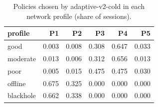 \begin{table}[htbp]
\centering
\small
\caption{Policies chosen by adaptive-v2-cold in each network profile (share of sessions).}
\label{tab:policy_share_adaptive_v2_cold}
\begin{tabular}{l r r r r r}
\toprule
profile & P1 & P2 & P3 & P4 & P5 \\
\midrule
good & 0.003 & 0.008 & 0.308 & 0.647 & 0.033 \\
moderate & 0.013 & 0.006 & 0.312 & 0.656 & 0.013 \\
poor & 0.005 & 0.015 & 0.475 & 0.475 & 0.030 \\
offline & 0.675 & 0.325 & 0.000 & 0.000 & 0.000 \\
blackhole & 0.662 & 0.338 & 0.000 & 0.000 & 0.000 \\
\bottomrule
\end{tabular}
\end{table}
